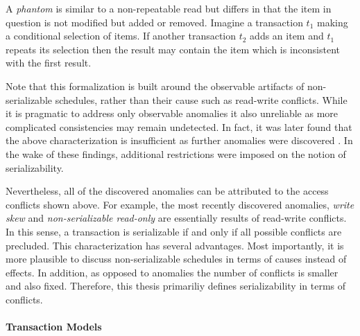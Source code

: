 A \emph{phantom} is similar to a non-repeatable read but differs in that the
item in question is not modified but added or removed. Imagine a transaction
$t_1$ making a conditional selection of items. If another transaction $t_2$ adds
an item and $t_1$ repeats its selection then the result may contain the item
which is inconsistent with the first result.

Note that this formalization is built around the observable artifacts of
non-serializable schedules, rather than their cause such as read-write
conflicts. While it is pragmatic to address only observable anomalies it also
unreliable as more complicated consistencies may remain undetected. In fact, it
was later found that the above characterization is insufficient as further
anomalies were discovered \cite{berenson1995critique, fekete2004read}. In the
wake of these findings, additional restrictions were imposed on the notion of
serializability.

Nevertheless, all of the discovered anomalies can be attributed to the access
conflicts shown above. For example, the most recently discovered anomalies,
\emph{write skew} and \emph{non-serializable read-only} are essentially results
of read-write conflicts. In this sense, a transaction is serializable if and
only if all possible conflicts are precluded. This characterization has several
advantages. Most importantly, it is more plausible to discuss non-serializable
schedules in terms of causes instead of effects. In addition, as opposed to
anomalies the number of conflicts is smaller and also fixed. Therefore, this
thesis primariliy defines serializability in terms of conflicts.


\paragraph{Transaction Models}

